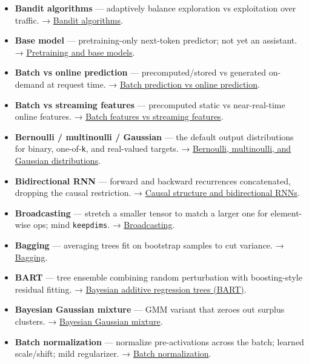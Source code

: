 \documentclass[
  10pt,
  letterpaper,
  onecolumn]{article}
\begin{document}
\begin{itemize}
\item
  \textbf{Bandit algorithms} --- adaptively balance exploration vs
  exploitation over traffic. →
  \protect\hyperlink{bandit-algorithms}{Bandit algorithms}.
\item
  \textbf{Base model} --- pretraining-only next-token predictor; not yet
  an assistant. →
  \protect\hyperlink{pretraining-and-base-models}{Pretraining and base
  models}.
\item
  \textbf{Batch vs online prediction} --- precomputed/stored vs
  generated on-demand at request time. →
  \protect\hyperlink{batch-prediction-vs-online-prediction}{Batch
  prediction vs online prediction}.
\item
  \textbf{Batch vs streaming features} --- precomputed static vs
  near-real-time online features. →
  \protect\hyperlink{batch-features-vs-streaming-features}{Batch
  features vs streaming features}.
\item
  \textbf{Bernoulli / multinoulli / Gaussian} --- the default output
  distributions for binary, one-of-\texttt{k}, and real-valued targets.
  →
  \protect\hyperlink{bernoulli-multinoulli-and-gaussian-distributions}{Bernoulli,
  multinoulli, and Gaussian distributions}.
\item
  \textbf{Bidirectional RNN} --- forward and backward recurrences
  concatenated, dropping the causal restriction. →
  \protect\hyperlink{causal-structure-and-bidirectional-rnns}{Causal
  structure and bidirectional RNNs}.
\item
  \textbf{Broadcasting} --- stretch a smaller tensor to match a larger
  one for element-wise ops; mind \texttt{keepdims}. →
  \protect\hyperlink{broadcasting}{Broadcasting}.
\item
  \textbf{Bagging} --- averaging trees fit on bootstrap samples to cut
  variance. → \protect\hyperlink{bagging}{Bagging}.
\item
  \textbf{BART} --- tree ensemble combining random perturbation with
  boosting-style residual fitting. →
  \protect\hyperlink{bayesian-additive-regression-trees-bart}{Bayesian
  additive regression trees (BART)}.
\item
  \textbf{Bayesian Gaussian mixture} --- GMM variant that zeroes out
  surplus clusters. →
  \protect\hyperlink{bayesian-gaussian-mixture}{Bayesian Gaussian
  mixture}.
\item
  \textbf{Batch normalization} --- normalize pre-activations across the
  batch; learned scale/shift; mild regularizer. →
  \protect\hyperlink{batch-normalization}{Batch normalization}.

\end{itemize}
\end{document}
